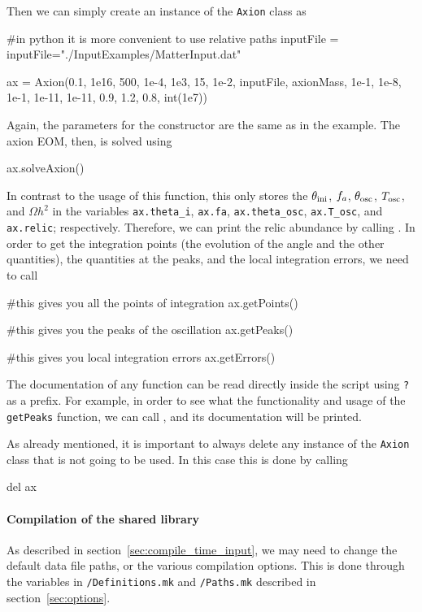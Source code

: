 \documentclass[11pt,a4paper]{article}
\begin{document}
Then we can simply create an instance of the {\tt Axion} class as 
%
\begin{py}
	#in python it is more convenient to use relative paths
	inputFile = inputFile="./InputExamples/MatterInput.dat"  
	
	ax = Axion(0.1, 1e16, 500, 1e-4, 1e3, 15, 1e-2, inputFile, axionMass, 
	1e-1, 1e-8, 1e-1, 1e-11, 1e-11, 0.9, 1.2, 0.8, int(1e7))
\end{py}
%
Again, the parameters for the constructor are the same as in the \CPP example. The axion EOM, then, is solved using
%
\begin{py}
	ax.solveAxion()
\end{py}
%
In contrast to the \CPP usage of this function, this only stores the $\theta_{\rm ini}{}$, $f_{a}{}$, $\theta_{\rm osc}{}$, $T_{\rm osc}{}$, and $\Omega h^2$ in the variables {\tt ax.theta\_i}, {\tt ax.fa}, {\tt ax.theta\_osc}, {\tt ax.T\_osc}, and {\tt ax.relic}; respectively. Therefore, we can print the relic abundance by calling . In order to get the integration points (\ie the evolution of the angle and the other quantities), the quantities at the  peaks, and the local integration errors, we need to call
%
\begin{py}
	#this gives you all the points of integration
	ax.getPoints()
	
	#this gives you the peaks of the oscillation
	ax.getPeaks()
	
	#this gives you local integration errors
	ax.getErrors()
\end{py}
%
The documentation of any \PY function can be read directly inside the script using {\tt ?} as a prefix. For example, in order to see what the functionality and usage of the {\tt getPeaks} function, we can call , and its documentation will be printed. 

As already mentioned, it is important to always delete any instance of the {\tt Axion} class that is not going to be used. In this case this is done by calling
%
\begin{py}
	del ax
\end{py}


\paragraph{Compilation of the shared library}
%
As described in section~\ref{sec:compile_time_input}, we may need to change the default data file paths, or the various compilation options. This is done through the variables in {\tt \mimes/Definitions.mk} and {\tt \mimes/Paths.mk} described in section~\ref{sec:options}. 
\end{document}
